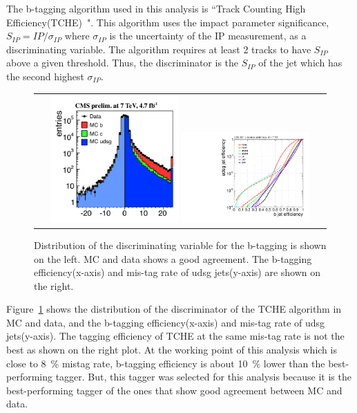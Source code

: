 The b-tagging algorithm used in this analysis is 
``Track Counting High Efficiency(TCHE)~\cite{Chatrchyan:1494669}".
This algorithm uses the impact parameter significance, $S_{IP} = IP / \sigma_{IP}$ 
where $\sigma_{IP}$ is the uncertainty of the IP measurement, 
as a discriminating variable. The algorithm requires at least 2 tracks to have $S_{IP}$ 
above a given threshold. Thus, the discriminator is the $S_{IP}$ of the jet 
which has the second highest $\sigma_{IP}$. 

\begin{figure}[htp] 
\centering 
\begin{tabular}{c} 
\includegraphics[width=0.45\textwidth]{figures/TCHE.pdf}
\includegraphics[width=0.45\textwidth]{figures/Figure_007-a.pdf}
\end{tabular} 
\caption{Distribution of the discriminating variable for the b-tagging is shown 
on the left. MC and data shows a good agreement.   
The b-tagging efficiency(x-axis) and mis-tag rate of udsg jets(y-axis) 
are shown on the right.}
\label{fig:btagperformance} 
\end{figure} 
Figure~\ref{fig:btagperformance} shows the distribution of the discriminator of the 
TCHE algorithm in MC and data, and 
the b-tagging efficiency(x-axis) and mis-tag rate of udsg jets(y-axis). 
The tagging efficiency of TCHE at the same mis-tag rate is not the best as 
shown on the right plot. At the working point of this analysis which is close 
to 8~\% mistag rate, b-tagging efficiency is about 10~\% lower than the 
best-performing tagger. But, this tagger was selected for this analysis 
because it is the best-performing tagger of the ones that show good agreement 
between MC and data. 
